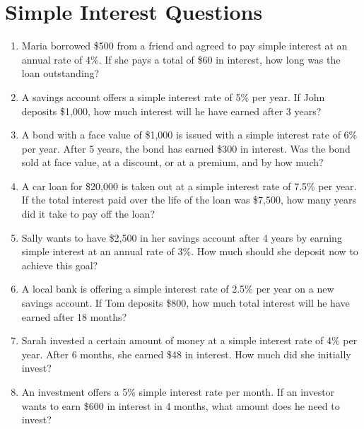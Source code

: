 \documentclass{article}
\begin{document}
\section*{Simple Interest Questions}

\begin{enumerate}
  \item Maria borrowed \$500 from a friend and agreed to pay simple interest at an annual rate of 4\%. If she pays a total of \$60 in interest, how long was the loan outstanding?
  \vspace{4cm}
  
  \item A savings account offers a simple interest rate of 5\% per year. If John deposits \$1,000, how much interest will he have earned after 3 years?
  \vspace{4cm}
  
  \item A bond with a face value of \$1,000 is issued with a simple interest rate of 6\% per year. After 5 years, the bond has earned \$300 in interest. Was the bond sold at face value, at a discount, or at a premium, and by how much?
  \vspace{4cm}
  
  \item A car loan for \$20,000 is taken out at a simple interest rate of 7.5\% per year. If the total interest paid over the life of the loan was \$7,500, how many years did it take to pay off the loan?
  \vspace{4cm}
  
  \item Sally wants to have \$2,500 in her savings account after 4 years by earning simple interest at an annual rate of 3\%. How much should she deposit now to achieve this goal?
  \vspace{4cm}
  
  \item A local bank is offering a simple interest rate of 2.5\% per year on a new savings account. If Tom deposits \$800, how much total interest will he have earned after 18 months?
  \vspace{4cm}
  
  \item Sarah invested a certain amount of money at a simple interest rate of 4\% per year. After 6 months, she earned \$48 in interest. How much did she initially invest?
  \vspace{4cm}
  
  \item An investment offers a 5\% simple interest rate per month. If an investor wants to earn \$600 in interest in 4 months, what amount does he need to invest?
  \vspace{4cm}
\end{enumerate}
\end{document}
